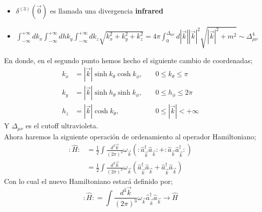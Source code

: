 \documentclass[../main.tex]{subfiles}
\begin{document}
  \begin{itemize}
    \item $\delta^{(3)}(\vec{0})$ es llamada una divergencia \textbf{infrared} 
    \item $\int^{+\infty}_{-\infty}dk_x \int^{+\infty}_{-\infty} dhk_y \int^{+\infty}_{-\infty}dk_z \sqrt{k_x^2 + k_y^2 + k_z^2} = 4\pi \int^{\Delta_{\mu\nu}}_0 d|\vec{k}||\vec{k}|^2 \sqrt{|\vec{k}|^2 + m^2} \sim \Delta^4_{\mu\nu}$ 
  \end{itemize}
  En donde, en el segundo punto hemos hecho el siguiente cambio de coordenadas;
  \begin{align}
    k_x & = |\vec{k}|\sinh{k_\theta} \cosh{k_{\phi}}, \quad & 0\leq k_\theta \leq \pi \\
    k_y & = |\vec{k}| \sinh{h_\theta} \sinh{k_\phi}, \quad & 0\leq h_\phi \leq 2\pi \\
    h_z & = |\vec{k}|\cosh{k_{\theta}}, \quad & 0\leq |\vec{k}| < +\infty 
  \end{align}
  Y $\Delta_{\mu\nu}$ es el cutoff ultravioleta. \\
  Ahora haremos la siguiente operación de ordenamiento al operador Hamiltoniano;
  \begin{align*}
    :\hat{H }: & = \frac{1}{2}\int \frac{d^3\vec{k}}{(2\pi)^3} \omega_{\vec{k}} \left( :\hat{a}^\dagger_{\vec{k}} \hat{a}_{\vec{k}}: + :\hat{a}_{\vec{k}} \hat{a}^\dagger_{\vec{k}}:\right) \\
    & = \frac{1}{2} \int \frac{d^3\vec{k}}{(2\pi)^3} \omega_{\vec{k}} \left( \hat{a}^\dagger_{\vec{k}} \hat{a}_{\vec{k}}  + \hat{a}^\dagger_{\vec{k}}\hat{a}_{\vec{k}}\right)
  \end{align*}
  Con lo cual el nuevo Hamiltoniano estará definido por;
  \begin{equation}
    :\hat{H}: = \int \frac{d^3\vec{k}}{(2\pi)^3} \omega_{\vec{k}} \hat{a}^\dagger_{\vec{k}} \hat{a}_{\vec{k}} \longrightarrow \hat{H}
   \end{equation}
\end{document}
